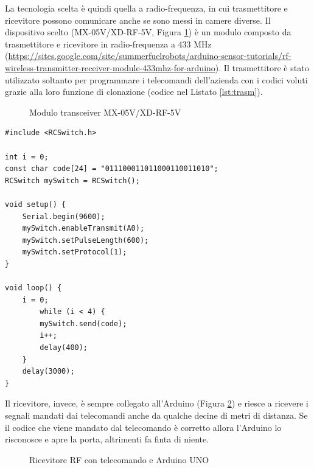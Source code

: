 \documentclass[12pt]{report}
\begin{document}
La tecnologia scelta è quindi quella a radio-frequenza, in cui trasmettitore e ricevitore possono comunicare anche se sono messi in camere diverse. Il dispositivo scelto (MX-05V/XD-RF-5V, Figura \ref{fig:rx_tx_module}) è un modulo composto da trasmettitore e ricevitore in radio-frequenza a 433 MHz (\url{https://sites.google.com/site/summerfuelrobots/arduino-sensor-tutorials/rf-wireless-transmitter-receiver-module-433mhz-for-arduino}). Il trasmettitore è stato utilizzato soltanto per programmare i telecomandi dell'azienda con i codici voluti grazie alla loro funzione di clonazione (codice nel Listato \ref{lst:trasm}).

\begin{figure}[H]
	\caption{Modulo transceiver MX-05V/XD-RF-5V}
	\label{fig:rx_tx_module}
\end{figure}


\begin{lstlisting}[caption={L'Arduino utilizza il trasmettitore per trasmettere i codici clonati dai telecomandi.}, label={lst:trasm}]
#include <RCSwitch.h>

int i = 0;
const char code[24] = "011100011011000110011010";
RCSwitch mySwitch = RCSwitch();

void setup() {
	Serial.begin(9600);
	mySwitch.enableTransmit(A0);
	mySwitch.setPulseLength(600);
	mySwitch.setProtocol(1);
}

void loop() {
	i = 0;
		while (i < 4) {
		mySwitch.send(code);
		i++;
		delay(400);
	}
	delay(3000);
}
\end{lstlisting}

Il ricevitore, invece, è sempre collegato all'Arduino (Figura \ref{fig:rf_uno}) e riesce a ricevere i segnali mandati dai telecomandi anche da qualche decine di metri di distanza. Se il codice che viene mandato dal telecomando è corretto allora l'Arduino lo risconosce e apre la porta, altrimenti fa finta di niente. 

\begin{figure}[H]
	\caption{Ricevitore RF con telecomando e Arduino UNO}
	\label{fig:rf_uno}
\end{figure}
\end{document}
